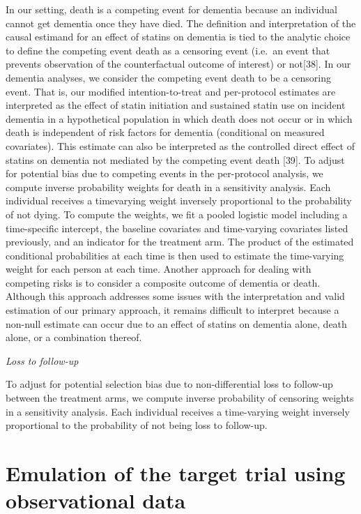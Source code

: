 \documentclass[
]{book}
\begin{document}
In our setting, death is a competing event for dementia because an individual cannot get dementia once they have died. The definition and interpretation of the causal estimand for an effect of statins on dementia is tied to the analytic choice to define the competing event death as a censoring event (i.e.~an event that prevents observation of the counterfactual outcome of interest) or not{[}38{]}. In our dementia analyses, we consider the competing event death to be a censoring event. That is, our modified intention-to-treat and per-protocol estimates are interpreted as the effect of statin initiation and sustained statin use on incident dementia in a hypothetical population in which death does not occur or in which death is independent of risk factors for dementia (conditional on measured covariates). This estimate can also be interpreted as the controlled direct effect of statins on dementia not mediated by the competing event death {[}39{]}. To adjust for potential bias due to competing events in the per-protocol analysis, we compute inverse probability weights for death in a sensitivity analysis. Each individual receives a timevarying weight inversely proportional to the probability of not dying. To compute the weights, we fit a pooled logistic model including a time-specific intercept, the baseline covariates and time-varying covariates listed previously, and an indicator for the treatment arm. The product of the estimated conditional probabilities at each time is then used to estimate the time-varying weight for each person at each time. Another approach for dealing with competing risks is to consider a composite outcome of dementia or death. Although this approach addresses some issues with the interpretation and valid estimation of our primary approach, it remains difficult to interpret because a non-null estimate can occur due to an effect of statins on dementia alone, death alone, or a combination thereof.

\emph{Loss to follow-up}

To adjust for potential selection bias due to non-differential loss to follow-up between the treatment arms, we compute inverse probability of censoring weights in a sensitivity analysis. Each individual receives a time-varying weight inversely proportional to the probability of not being loss to follow-up.

\hypertarget{emulation-of-the-target-trial-using-observational-data}{%
\section{Emulation of the target trial using observational data}\label{emulation-of-the-target-trial-using-observational-data}}
\end{document}
